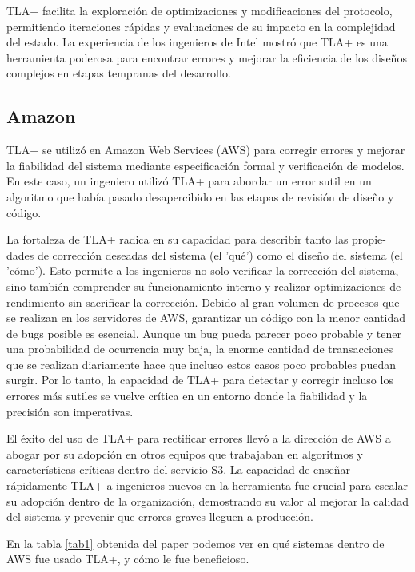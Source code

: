 \documentclass[runningheads]{llncs}
\begin{document}
TLA+ facilita la exploración de optimizaciones y modificaciones del protocolo, permitiendo iteraciones rápidas y evaluaciones de su impacto en la complejidad del estado. La experiencia de los ingenieros de Intel mostró que TLA+ es una herramienta poderosa para encontrar errores y mejorar la eficiencia de los diseños complejos en etapas tempranas del desarrollo.

\subsection{Amazon}
TLA+ se utilizó en Amazon Web Services (AWS) para corregir errores y mejorar la fiabilidad del sistema mediante especificación formal y verificación de modelos. En este caso, un ingeniero utilizó TLA+ para abordar un error sutil en un algoritmo que había pasado desapercibido en las etapas de revisión de diseño y código.

La fortaleza de TLA+ radica en su capacidad para describir tanto las propie-\\dades de corrección deseadas del sistema (el 'qué') como el diseño del sistema (el 'cómo'). Esto permite a los ingenieros no solo verificar la corrección del sistema, sino también comprender su funcionamiento interno y realizar optimizaciones de rendimiento sin sacrificar la corrección. Debido al gran volumen de procesos que se realizan en los servidores de AWS, garantizar un código con la menor cantidad de bugs posible es esencial. Aunque un bug pueda parecer poco probable y tener una probabilidad de ocurrencia muy baja, la enorme cantidad de transacciones que se realizan diariamente hace que incluso estos casos poco probables puedan surgir. Por lo tanto, la capacidad de TLA+ para detectar y corregir incluso los errores más sutiles se vuelve crítica en un entorno donde la fiabilidad y la precisión son imperativas.

El éxito del uso de TLA+ para rectificar errores llevó a la dirección de AWS a abogar por su adopción en otros equipos que trabajaban en algoritmos y características críticas dentro del servicio S3. La capacidad de enseñar rápidamente TLA+ a ingenieros nuevos en la herramienta fue crucial para escalar su adopción dentro de la organización, demostrando su valor al mejorar la calidad del sistema y prevenir que errores graves lleguen a producción.

En la tabla \ref{tab1} obtenida del paper podemos ver en qué sistemas dentro de AWS fue usado TLA+, y cómo le fue beneficioso.
\end{document}
